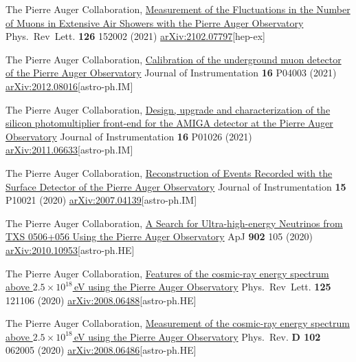 \begin{etaremune}
\item {} The Pierre Auger Collaboration, \href{https://doi.org/10.1103/PhysRevLett.126.152002}{Measurement of the Fluctuations in the Number of Muons in Extensive Air Showers with the Pierre Auger Observatory} Phys.\ Rev\  Lett. {\textbf{126}} 152002 (2021) \href{https://arxiv.org/abs/2102.07797}{arXiv:2102.07797}[hep-ex]

\item {}The Pierre Auger Collaboration, \href{https://doi.org/10.1088/1748-0221/16/04/P04003}{Calibration of the underground muon detector of the Pierre Auger Observatory} Journal of Instrumentation {\textbf{16}} P04003 (2021) \href{https://arxiv.org/abs/2012.08016}{arXiv:2012.08016}[astro-ph.IM]

\item {}The Pierre Auger Collaboration, \href{https://doi.org/10.1088/1748-0221/16/01/P01026}{Design, upgrade and characterization of the silicon photomultiplier front-end for the AMIGA detector at the Pierre Auger Observatory} Journal of Instrumentation {\textbf{16}} P01026 (2021) \href{ https://arxiv.org/abs/2011.06633}{arXiv:2011.06633}[astro-ph.IM]

\item {}The Pierre Auger Collaboration, \href{https://doi.org/10.1088/1748-0221/15/10/P10021}{Reconstruction of Events Recorded with the Surface Detector of the Pierre Auger Observatory} Journal of Instrumentation {\textbf{15}} P10021 (2020) \href{https://arxiv.org/abs/2007.04139}{arXiv:2007.04139}[astro-ph.IM]

\item {}The Pierre Auger Collaboration, \href{https://doi.org/10.3847/1538-4357/abb476}{A Search for Ultra-high-energy Neutrinos from TXS 0506+056 Using the Pierre Auger Observatory} ApJ {\textbf{902}} 105 (2020) \href{https://arxiv.org/abs/2010.10953}{arXiv:2010.10953}[astro-ph.HE]

\item {}The Pierre Auger Collaboration, \href{https://doi.org/10.1103/PhysRevLett.125.121106}{Features of the cosmic-ray energy spectrum above $2.5\times 10^{18}$\,eV using the Pierre Auger Observatory} Phys.\ Rev\  Lett. {\textbf{125}} 121106 (2020) \href{https://arxiv.org/abs/2008.06488}{arXiv:2008.06488}[astro-ph.HE]

\item {}The Pierre Auger Collaboration, \href{https://doi.org/10.1103/PhysRevD.102.062005}{Measurement of the cosmic-ray energy spectrum above $2.5\times 10^{18}$\,eV using the Pierre Auger Observatory} Phys.\ Rev. {\textbf{D 102}} 062005 (2020) \href{https://arxiv.org/abs/2008.06486}{arXiv:2008.06486}[astro-ph.HE]


\end{etaremune}

